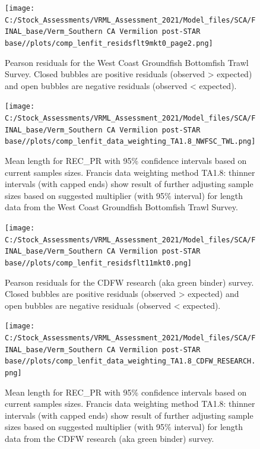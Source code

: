 \documentclass[
  english,
  a4paper,
]{article}
\begin{document}
\begin{figure}
\centering
\texttt{[image: C:/Stock\_Assessments/VRML\_Assessment\_2021/Model\_files/SCA/FINAL\_base/Verm\_Southern CA Vermilion post-STAR base//plots/comp\_lenfit\_residsflt9mkt0\_page2.png]}
\caption{Pearson residuals for the West Coast Groundfish Bottomfish Trawl Survey. Closed bubbles are positive residuals (observed \textgreater{} expected) and open bubbles are negative residuals (observed \textless{} expected).\label{fig:len-pearson-NWFSC-TWL}}
\end{figure}

\begin{figure}
\centering
\texttt{[image: C:/Stock\_Assessments/VRML\_Assessment\_2021/Model\_files/SCA/FINAL\_base/Verm\_Southern CA Vermilion post-STAR base//plots/comp\_lenfit\_data\_weighting\_TA1.8\_NWFSC\_TWL.png]}
\caption{Mean length for REC\_PR with 95\% confidence intervals based on current samples sizes. Francis data weighting method TA1.8: thinner intervals (with capped ends) show result of further adjusting sample sizes based on suggested multiplier (with 95\% interval) for length data from the West Coast Groundfish Bottomfish Trawl Survey.\label{fig:mean-len-fit-NWFSC-TWL}}
\end{figure}

\begin{figure}
\centering
\texttt{[image: C:/Stock\_Assessments/VRML\_Assessment\_2021/Model\_files/SCA/FINAL\_base/Verm\_Southern CA Vermilion post-STAR base//plots/comp\_lenfit\_residsflt11mkt0.png]}
\caption{Pearson residuals for the CDFW research (aka green binder) survey. Closed bubbles are positive residuals (observed \textgreater{} expected) and open bubbles are negative residuals (observed \textless{} expected).\label{fig:len-pearson-CDFW-RESEARCH}}
\end{figure}

\begin{figure}
\centering
\texttt{[image: C:/Stock\_Assessments/VRML\_Assessment\_2021/Model\_files/SCA/FINAL\_base/Verm\_Southern CA Vermilion post-STAR base//plots/comp\_lenfit\_data\_weighting\_TA1.8\_CDFW\_RESEARCH.png]}
\caption{Mean length for REC\_PR with 95\% confidence intervals based on current samples sizes. Francis data weighting method TA1.8: thinner intervals (with capped ends) show result of further adjusting sample sizes based on suggested multiplier (with 95\% interval) for length data from the CDFW research (aka green binder) survey.\label{fig:mean-len-fit-CDFW-RESEARCH}}
\end{figure}
\end{document}
